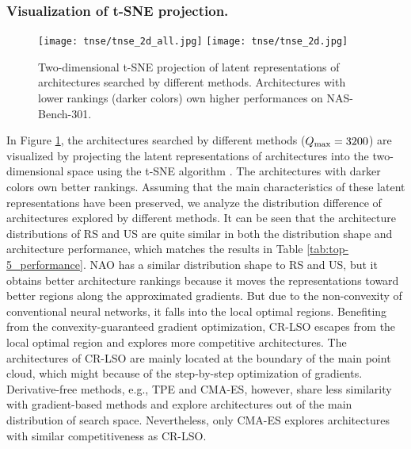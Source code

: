 \documentclass[10pt,twocolumn,letterpaper]{article}
\begin{document}
\subsubsection{Visualization of t-SNE projection.} \begin{figure}[htbp]
	\centering
	\texttt{[image: tnse/tnse\_2d\_all.jpg]}
	\texttt{[image: tnse/tnse\_2d.jpg]}
	\caption{Two-dimensional t-SNE projection of latent representations of architectures searched by different methods. Architectures with lower rankings (darker colors) own higher performances on NAS-Bench-301.}
	\label{fig:tnse_2d}
\end{figure}
In Figure \ref{fig:tnse_2d}, the architectures searched by different methods ($Q_{\rm max} = 3200$) are visualized by projecting the latent representations of architectures into the two-dimensional space using the t-SNE algorithm \cite{van2008visualizing}. The architectures with darker colors own better rankings. Assuming that the main characteristics of these latent representations have been preserved, we analyze the distribution difference of architectures explored by different methods. It can be seen that the architecture distributions of RS and US are quite similar in both the distribution shape and architecture performance, which matches the results in Table \ref{tab:top-5_performance}. NAO has a similar distribution shape to RS and US, but it obtains better architecture rankings because it moves the representations toward better regions along the approximated gradients. But due to the non-convexity of conventional neural networks, it falls into the local optimal regions. Benefiting from the convexity-guaranteed gradient optimization, CR-LSO escapes from the local optimal region and explores more competitive architectures. The architectures of CR-LSO are mainly located at the boundary of the main point cloud, which might because of the step-by-step optimization of gradients. Derivative-free methods, e.g., TPE and CMA-ES, however, share less similarity with gradient-based methods and explore architectures out of the main distribution of search space. Nevertheless, only CMA-ES explores architectures with similar competitiveness as CR-LSO.   
\end{document}
